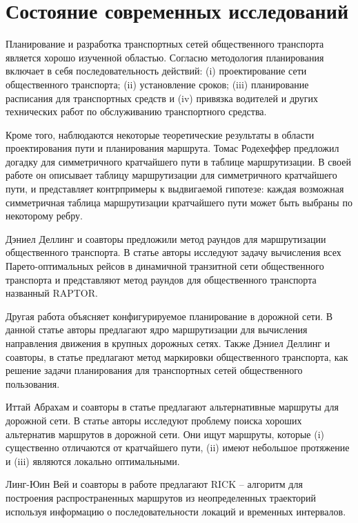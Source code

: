 \section{Состояние современных исследований}
Планирование и разработка транспортных сетей общественного транспорта является хорошо изученной областью.
Согласно \cite{ceder2007} методология планирования включает в себя последовательность действий: 
(i) проектирование сети общественного транспорта; (ii) установление сроков; (iii) планирование расписания 
для транспортных средств и (iv) привязка водителей и других технических работ по обслуживанию транспортного 
средства.

Кроме того, наблюдаются некоторые теоретические результаты в области проектирования пути и планирования 
маршрута. Томас Родехеффер предложил догадку для симметричного кратчайшего пути в таблице маршрутизации. 
В своей работе \cite{rodeheffer2013symmetric} он описывает таблицу маршрутизации для симметричного кратчайшего 
пути, и представляет контрпримеры к выдвигаемой гипотезе: каждая возможная симметричная таблица маршрутизации 
кратчайшего пути может быть выбраны по некоторому ребру.

Дэниел Деллинг и соавторы предложили метод раундов для маршрутизации общественного транспорта. В статье 
\cite{delling2014round} авторы исследуют задачу вычисления всех Парето-оптимальных рейсов в динамичной 
транзитной сети общественного транспорта и представляют метод раундов для общественного транспорта 
названный RAPTOR.

Другая работа \cite{delling2015customizable} объясняет конфигурируемое планирование в дорожной сети. В 
данной статье авторы предлагают ядро маршрутизации для вычисления направления движения в крупных дорожных 
сетях. Также Дэниел Деллинг и соавторы, в статье \cite{delling2015public} предлагают метод маркировки 
общественного транспорта, как решение задачи планирования для транспортных сетей общественного 
пользования.

Иттай Абрахам и соавторы в статье \cite{abraham2013alternative} предлагают альтернативные маршруты для 
дорожной сети. В статье авторы исследуют проблему поиска хороших альтернатив маршрутов в дорожной сети. 
Они ищут маршруты, которые (i) существенно отличаются от кратчайшего пути, (ii) имеют небольшое протяжение 
и (iii) являются локально оптимальными.

Линг-Юин Вей и соавторы в работе \cite{wei2012constructing} предлагают RICK -- алгоритм для построения 
распространенных маршрутов из неопределенных траекторий используя информацию о последовательности локаций
и временных интервалов.


